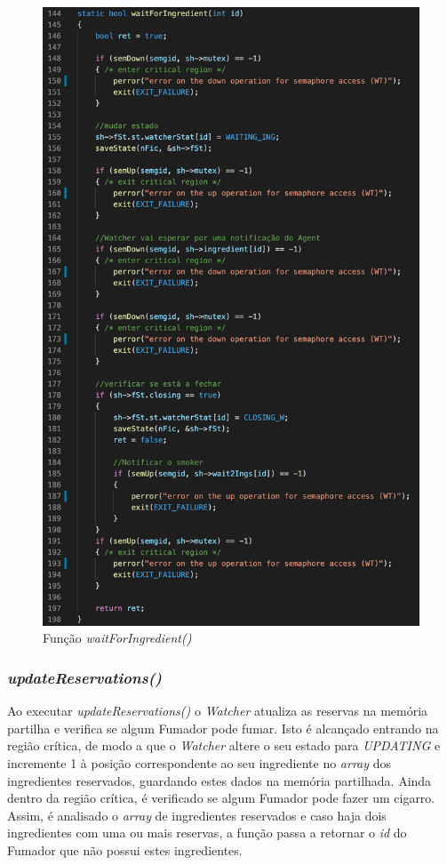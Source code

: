 \documentclass[10pt,portuguese]{article}
\begin{document}
\begin{figure}[!h]
    \centering
    \includegraphics[scale=0.7]{images/implementation/waitforing.png}
    \caption{Função \textit{waitForIngredient()}}
\end{figure}

\clearpage

\subsubsection{\textit{updateReservations()}}

\par Ao executar \textit{updateReservations()} o \textit{Watcher} atualiza as reservas na memória partilha e verifica se algum Fumador pode fumar. Isto é alcançado entrando na região crítica, de modo a que o \textit{Watcher} altere o seu estado para \textit{UPDATING} e incremente 1 à posição correspondente ao seu ingrediente no \textit{array} dos ingredientes reservados, guardando estes dados na memória partilhada. Ainda dentro da região crítica, é verificado se algum Fumador pode fazer um cigarro. Assim, é analisado o \textit{array} de ingredientes reservados e caso haja dois ingredientes com uma ou mais reservas, a função passa a retornar o \textit{id} do Fumador que não possui estes ingredientes.
\end{document}
